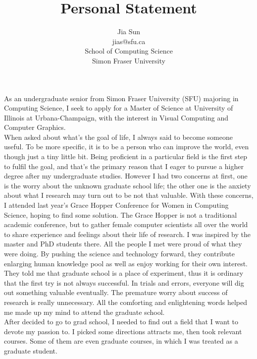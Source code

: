 \documentclass{article}
\title{Personal Statement}
\author{Jia Sun\\jias@sfu.ca\\School of Computing Science\\Simon Fraser University}
\begin{document}
\maketitle%

As an undergraduate senior from Simon Fraser University (SFU) majoring in Computing Science, I seek to apply for a Master of Science at University of Illinois at Urbana-Champaign, with the interest in Visual Computing and Computer Graphics.\\


When asked about what's the goal of life, I always said to become someone useful. To be more specific, it is to be a person who can improve the world, even though just a tiny little bit. Being proficient in a particular field is the first step to fulfil the goal, and that's the primary reason that I eager to pursue a higher degree after my undergraduate studies. However I had two concerns at first, one is the worry about the unknown graduate school life; the other one is the anxiety about what I research may turn out to be not that valuable. With these concerns, I attended last year's Grace Hopper Conference for Women in Computing Science, hoping to find some solution. The Grace Hopper is not a traditional academic conference, but to gather female computer scientists all over the world to share experience and feelings about their life of research. I was inspired by the master and PhD students there. All the people I met were proud of what they were doing. By pushing the science and technology forward, they contribute enlarging human knowledge pool as well as enjoy working for their own interest. They told me that graduate school is a place of experiment, thus it is ordinary that the first try is not always successful. In trials and errors, everyone will dig out something valuable eventually. The premature worry about success of research is really unnecessary. All the comforting and enlightening words helped me made up my mind to attend the graduate school.  \\


After decided to go to grad school, I needed to find out a field that I want to devote my passion to. I picked some directions attracts me, then took relevant courses. Some of them are even graduate courses, in which I was treated as a graduate student.\\
\end{document}
